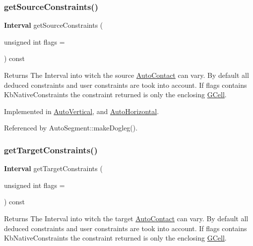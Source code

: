 \subsubsection{\texorpdfstring{get\+Source\+Constraints()}{getSourceConstraints()}}
{\footnotesize\ttfamily \textbf{ Interval} get\+Source\+Constraints (\begin{DoxyParamCaption}\item[{unsigned int}]{flags = {} }\end{DoxyParamCaption}) const\hspace{0.3cm}{\ttfamily [pure virtual]}}

\begin{DoxyReturn}{Returns}
The Interval into witch the source \hyperlink{classKatabatic_1_1AutoContact}{Auto\+Contact} can vary. By default all deduced constraints and user constraints are took into account. If {\ttfamily flags} contains {\ttfamily Kb\+Native\+Constraints} the constraint returned is only the enclosing \hyperlink{classKatabatic_1_1GCell}{G\+Cell}. 
\end{DoxyReturn}


Implemented in \hyperlink{classKatabatic_1_1AutoVertical_a3239751f475bc65adb9d56f6c771ebb0}{Auto\+Vertical}, and \hyperlink{classKatabatic_1_1AutoHorizontal_a3239751f475bc65adb9d56f6c771ebb0}{Auto\+Horizontal}.



Referenced by Auto\+Segment\+::make\+Dogleg().

\mbox{\label{classKatabatic_1_1AutoSegment_a9c1b8b3cd57fb7b0bf60c7a6148237c2}} 
\subsubsection{\texorpdfstring{get\+Target\+Constraints()}{getTargetConstraints()}}
{\footnotesize\ttfamily \textbf{ Interval} get\+Target\+Constraints (\begin{DoxyParamCaption}\item[{unsigned int}]{flags = {} }\end{DoxyParamCaption}) const\hspace{0.3cm}{\ttfamily [pure virtual]}}

\begin{DoxyReturn}{Returns}
The Interval into witch the target \hyperlink{classKatabatic_1_1AutoContact}{Auto\+Contact} can vary. By default all deduced constraints and user constraints are took into account. If {\ttfamily flags} contains {\ttfamily Kb\+Native\+Constraints} the constraint returned is only the enclosing \hyperlink{classKatabatic_1_1GCell}{G\+Cell}. 
\end{DoxyReturn}


